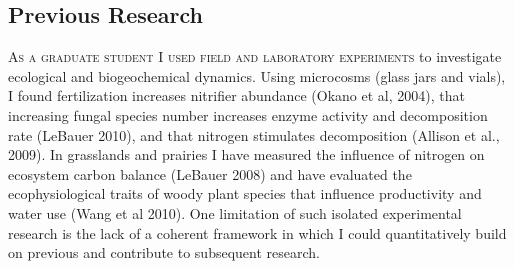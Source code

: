 \documentclass[english]{tufte-handout}
\providecommand\mynewthought[1]{%
   \addvspace{0.5em}%
   \noindent\hspace{-0.5em}\textsc{#1} %
}
\begin{document}
\begin{fullwidth}
\begin{abstract}


\end{abstract}

\section{Previous Research}

\mynewthought{As a graduate student I used field and laboratory experiments} to investigate ecological and biogeochemical dynamics.
 Using microcosms (glass jars and vials), I found fertilization increases nitrifier abundance (Okano et al, 2004), that increasing fungal species number increases enzyme activity and decomposition rate (LeBauer 2010), and that nitrogen stimulates decomposition (Allison et al., 2009).
 In grasslands and prairies I have measured the influence of nitrogen on ecosystem carbon balance (LeBauer 2008) and have evaluated the ecophysiological traits of woody plant species that influence productivity and water use (Wang et al 2010).
 One limitation of such isolated experimental research is the lack of a coherent framework in which I could quantitatively build on previous and contribute to subsequent research.  


\end{fullwidth}
\end{document}
